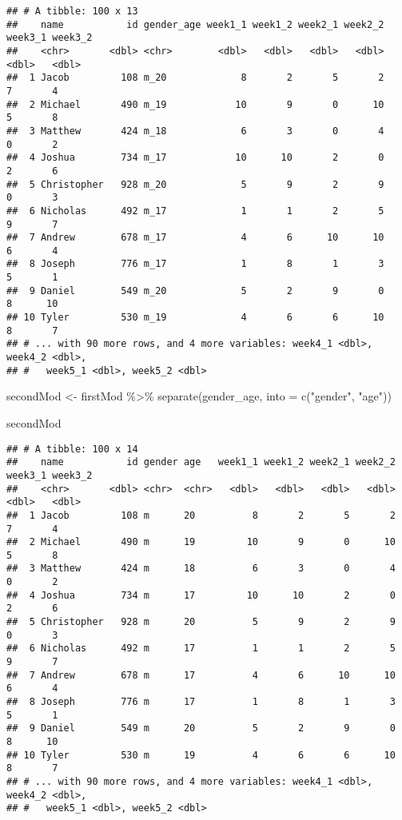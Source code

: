 \documentclass[
]{article}
\newenvironment{Shaded}{\begin{snugshade}}{\end{snugshade}}
\newcommand{\AttributeTok}[1]{\textcolor[rgb]{0.77,0.63,0.00}{#1}}
\newcommand{\FunctionTok}[1]{\textcolor[rgb]{0.00,0.00,0.00}{#1}}
\newcommand{\NormalTok}[1]{#1}
\newcommand{\OtherTok}[1]{\textcolor[rgb]{0.56,0.35,0.01}{#1}}
\newcommand{\SpecialCharTok}[1]{\textcolor[rgb]{0.00,0.00,0.00}{#1}}
\newcommand{\StringTok}[1]{\textcolor[rgb]{0.31,0.60,0.02}{#1}}
\begin{document}
\begin{verbatim}
## # A tibble: 100 x 13
##    name           id gender_age week1_1 week1_2 week2_1 week2_2 week3_1 week3_2
##    <chr>       <dbl> <chr>        <dbl>   <dbl>   <dbl>   <dbl>   <dbl>   <dbl>
##  1 Jacob         108 m_20             8       2       5       2       7       4
##  2 Michael       490 m_19            10       9       0      10       5       8
##  3 Matthew       424 m_18             6       3       0       4       0       2
##  4 Joshua        734 m_17            10      10       2       0       2       6
##  5 Christopher   928 m_20             5       9       2       9       0       3
##  6 Nicholas      492 m_17             1       1       2       5       9       7
##  7 Andrew        678 m_17             4       6      10      10       6       4
##  8 Joseph        776 m_17             1       8       1       3       5       1
##  9 Daniel        549 m_20             5       2       9       0       8      10
## 10 Tyler         530 m_19             4       6       6      10       8       7
## # ... with 90 more rows, and 4 more variables: week4_1 <dbl>, week4_2 <dbl>,
## #   week5_1 <dbl>, week5_2 <dbl>
\end{verbatim}

\begin{Shaded}
\begin{Highlighting}[]
\NormalTok{secondMod }\OtherTok{\textless{}{-}}\NormalTok{ firstMod }\SpecialCharTok{\%\textgreater{}\%} 
  \FunctionTok{separate}\NormalTok{(gender\_age, }\AttributeTok{into =} \FunctionTok{c}\NormalTok{(}\StringTok{"gender"}\NormalTok{, }\StringTok{"age"}\NormalTok{))}

\NormalTok{secondMod}
\end{Highlighting}
\end{Shaded}

\begin{verbatim}
## # A tibble: 100 x 14
##    name           id gender age   week1_1 week1_2 week2_1 week2_2 week3_1 week3_2
##    <chr>       <dbl> <chr>  <chr>   <dbl>   <dbl>   <dbl>   <dbl>   <dbl>   <dbl>
##  1 Jacob         108 m      20          8       2       5       2       7       4
##  2 Michael       490 m      19         10       9       0      10       5       8
##  3 Matthew       424 m      18          6       3       0       4       0       2
##  4 Joshua        734 m      17         10      10       2       0       2       6
##  5 Christopher   928 m      20          5       9       2       9       0       3
##  6 Nicholas      492 m      17          1       1       2       5       9       7
##  7 Andrew        678 m      17          4       6      10      10       6       4
##  8 Joseph        776 m      17          1       8       1       3       5       1
##  9 Daniel        549 m      20          5       2       9       0       8      10
## 10 Tyler         530 m      19          4       6       6      10       8       7
## # ... with 90 more rows, and 4 more variables: week4_1 <dbl>, week4_2 <dbl>,
## #   week5_1 <dbl>, week5_2 <dbl>
\end{verbatim}
\end{document}
